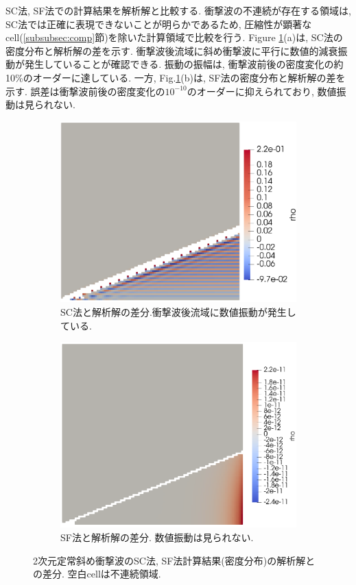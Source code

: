 \documentclass[a4j]{jarticle}
\begin{document}
SC法, SF法での計算結果を解析解と比較する.
衝撃波の不連続が存在する領域は, SC法では正確に表現できないことが明らかであるため,
圧縮性が顕著なcell(\ref{subsubsec:comp}節)を除いた計算領域で比較を行う.
Figure \ref{fig:2Ddiagcomp}(a)は, SC法の密度分布と解析解の差を示す.
衝撃波後流域に斜め衝撃波に平行に数値的減衰振動が発生していることが確認できる.
振動の振幅は, 衝撃波前後の密度変化の約10\%のオーダーに達している.
一方, Fig.\ref{fig:2Ddiagcomp}(b)は, SF法の密度分布と解析解の差を示す.
誤差は衝撃波前後の密度変化の$10^{-10}$のオーダーに抑えられており, 数値振動は見られない.
\begin{figure}[h]
  \centering
  \begin{subfigure}[t]{0.45\textwidth}
    \centering
    \includegraphics[width=\linewidth]{2Ddiagcompa.pdf}
    \caption{SC法と解析解の差分.衝撃波後流域に数値振動が発生している. }
  \end{subfigure}
  \hfill
  \begin{subfigure}[b]{0.45\textwidth}
    \centering
    \includegraphics[width=\linewidth]{2Ddiagcompb.pdf}
    \caption{SF法と解析解の差分. 数値振動は見られない.}
  \end{subfigure}
  \caption{2次元定常斜め衝撃波のSC法, SF法計算結果(密度分布)の解析解との差分. 空白cellは不連続領域.}
  \label{fig:2Ddiagcomp}
\end{figure}
\end{document}
